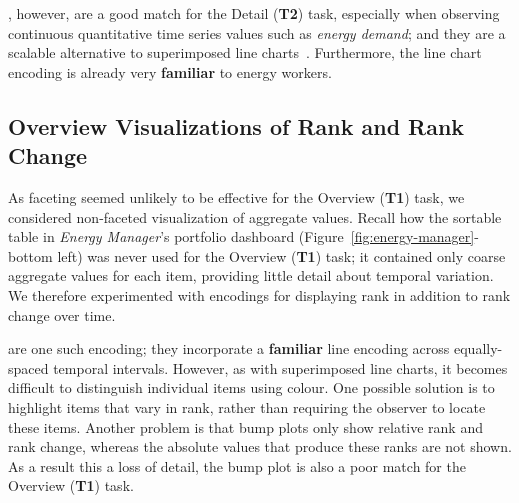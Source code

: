 \documentclass[journal]{vgtc}                %
\newcommand{\bqstart}[1]{\vspace{1mm} \noindent{\textbf{#1}}}
\begin{document}
\bqstart{Faceted line charts}, however, are a good match for the Detail ({\bf T2}) task, especially when observing continuous quantitative time series values such as {\it energy demand}; and they are a scalable alternative to superimposed line charts~\cite{Javed2010}. 
Furthermore, the line chart encoding is already very {\bf familiar} to energy workers.


\subsection{Overview Visualizations of Rank and Rank Change}
\label{design-ranking}


As faceting seemed unlikely to be effective for the Overview ({\bf T1}) task, we considered non-faceted visualization of aggregate values.
Recall how the sortable table in {\it Energy Manager}'s portfolio dashboard (Figure~\ref{fig:energy-manager}-bottom left) was never used for the Overview ({\bf T1}) task; it contained only coarse aggregate values for each item, providing little detail about temporal variation.
We therefore experimented with encodings for displaying rank in addition to rank change over time.

\bqstart{Bump plots} are one such encoding; they incorporate a {\bf familiar} line encoding across equally-spaced temporal intervals. 
However, as with superimposed line charts, it becomes difficult to distinguish individual items using colour.
One possible solution is to highlight items that vary in rank, rather than requiring the observer to locate these items.
Another problem is that bump plots only show relative rank and rank change, whereas the absolute values that produce these ranks are not shown. 
As a result this a loss of detail, the bump plot is also a poor match for the Overview ({\bf T1}) task.
\end{document}
